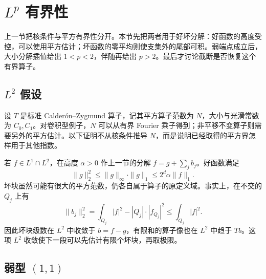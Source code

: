 \section{\texorpdfstring{\(L^p\)}{Lᵖ} 有界性}
\label{b2:sec:1804}

上一节把核条件与平方有界性分开。本节先把两者用于好坏分解：好函数的高度受控，可以使用平方估计；坏函数的零平均则使支集外的尾部可积。弱端点成立后，大小分解插值给出 \(1<p<2\)，伴随再给出 \(p>2\)。最后才讨论截断是否恢复这个有界算子。

\subsection{\texorpdfstring{\(L^2\)}{L2} 假设}
\label{b2:subsec:180401}

设 \(T\) 是标准 Calderón--Zygmund 算子，记其平方算子范数为 \(N\)，大小与光滑常数为 \(C_0,C_1\)。对卷积型例子，\(N\) 可以从有界 Fourier 乘子得到；非平移不变算子则需要另外的平方估计。以下证明不从核条件推导 \(N\)，而是说明已经取得的平方界怎样用于其他指数。

\ProseParagraphBreak

若 \(f\in L^1\cap L^2\)，在高度 \(\alpha>0\) 作上一节的分解 \(f=g+\sum_jb_j\)。好函数满足
\[
 \|g\|_2^2\leq\|g\|_\infty\cdot\|g\|_1
 \leq2^d\alpha\|f\|_1.
\]
坏块虽然可能有很大的平方范数，仍各自属于算子的原定义域。事实上，在不交的 \(Q_j\) 上有
\[
 \|b_j\|_2^2
 =\int_{Q_j}|f|^2-|Q_j|\cdot|f_{Q_j}|^2
 \leq\int_{Q_j}|f|^2.
\]
因此坏块级数在 \(L^2\) 中收敛于 \(b=f-g\)，有限和的算子像也在 \(L^2\) 中趋于 \(Tb\)。这项 \(L^2\) 收敛使下一段可以先估计有限个坏块，再取极限。

\subsection{弱型 \texorpdfstring{\((1,1)\)}{(1,1)}}
\label{b2:subsec:180402}

